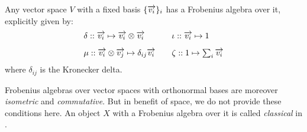 Any vector space $V$ with a fixed basis
$\{\overrightarrow{v_i}\}_i$ has a Frobenius algebra over it, explicitly given by:
\begin{equation*}\label{eq:frob}
\begin{array}{lll}
\delta :: \ov{v_i} \mapsto \ov{v_i} \otimes \ov{v_i} && \iota:: \ov{v_i} \mapsto 1\vspace{3mm}\\
\mu:: \ov{v_i} \otimes \ov{v_j} \mapsto 
\delta_{ij}\ov{v_i} 
&& \zeta:: 1 \mapsto   \sum_i  \ov{v_i}  
\end{array}
\end{equation*}
where $\delta_{ij}$ is the Kronecker delta.

Frobenius algebras over vector spaces with orthonormal bases are
moreover \emph{isometric} and \emph{commutative}. But in benefit of space, we do not provide these conditions here. 
An object $X$ with a Frobenius algebra over it is called
\emph{classical} in \cite{CoeckePaquettePavlovic09}. 


